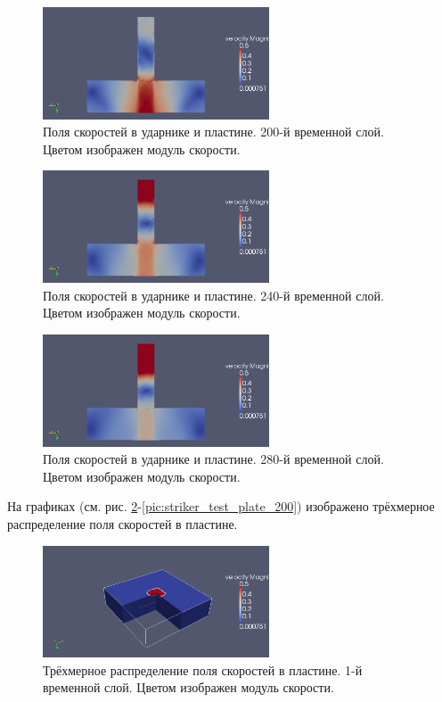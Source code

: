 \begin{figure}[htp]
\centering
\includegraphics[width=0.6\textwidth]{png/strike-test/both-2d/0200.png}
\caption{Поля скоростей в ударнике и пластине. 200-й временной слой. Цветом изображен модуль скорости.}
\end{figure}

\begin{figure}[htp]
\centering
\includegraphics[width=0.6\textwidth]{png/strike-test/both-2d/0240.png}
\caption{Поля скоростей в ударнике и пластине. 240-й временной слой. Цветом изображен модуль скорости.}
\end{figure}

\begin{figure}[htp]
\centering
\includegraphics[width=0.6\textwidth]{png/strike-test/both-2d/0280.png}
\caption{Поля скоростей в ударнике и пластине. 280-й временной слой. Цветом изображен модуль скорости.}
\label{pic:striker_test_2d_280}
\end{figure}

\clearpage

На графиках (см. рис. \ref{pic:striker_test_plate_1}-\ref{pic:striker_test_plate_200}) изображено трёхмерное распределение поля скоростей в пластине.

\begin{figure}[htp]
\centering
\includegraphics[width=0.6\textwidth]{png/strike-test/plate-3d-v/0001.png}
\caption{Трёхмерное распределение поля скоростей в пластине. 1-й временной слой. Цветом изображен модуль скорости.}
\label{pic:striker_test_plate_1}
\end{figure}

